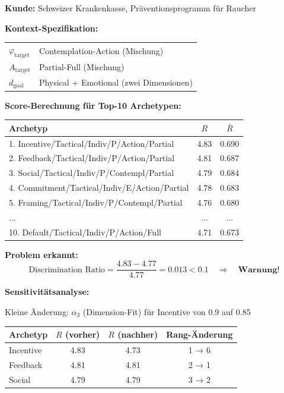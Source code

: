 \begin{tcolorbox}[colback=red!3!white, colframe=red!60!black,
    title=\textbf{Case Study 3: Die Krankenkasse und das Ranking-Roulette}]

\textbf{Kunde:} Schweizer Krankenkasse, Präventionsprogramm für Raucher

\textbf{Kontext-Spezifikation:}
\begin{center}
\begin{tabular}{@{}ll@{}}
$\varphi_{\text{target}}$ & Contemplation-Action (Mischung) \\
$A_{\text{target}}$ & Partial-Full (Mischung) \\
$d_{\text{goal}}$ & Physical + Emotional (zwei Dimensionen) \\
\end{tabular}
\end{center}

\textbf{Score-Berechnung für Top-10 Archetypen:}
\begin{center}
\begin{tabular}{@{}lcc@{}}
\toprule
\textbf{Archetyp} & $R$ & $\bar{R}$ \\
\midrule
1. Incentive/Tactical/Indiv/P/Action/Partial & 4.83 & 0.690 \\
2. Feedback/Tactical/Indiv/P/Action/Partial & 4.81 & 0.687 \\
3. Social/Tactical/Indiv/P/Contempl/Partial & 4.79 & 0.684 \\
4. Commitment/Tactical/Indiv/E/Action/Partial & 4.78 & 0.683 \\
5. Framing/Tactical/Indiv/P/Contempl/Partial & 4.76 & 0.680 \\
... & ... & ... \\
10. Default/Tactical/Indiv/P/Action/Full & 4.71 & 0.673 \\
\bottomrule
\end{tabular}
\end{center}

\textbf{Problem erkannt:}
\begin{equation*}
\text{Discrimination Ratio} = \frac{4.83 - 4.77}{4.77} = 0.013 < 0.1 \quad \Rightarrow \quad \textbf{Warnung!}
\end{equation*}

\textbf{Sensitivitätsanalyse:}

Kleine Änderung: $\alpha_3$ (Dimension-Fit) für Incentive von 0.9 auf 0.85
\begin{center}
\begin{tabular}{@{}lccc@{}}
\toprule
\textbf{Archetyp} & $R$ (vorher) & $R$ (nachher) & \textbf{Rang-Änderung} \\
\midrule
Incentive & 4.83 & 4.73 & 1 → 6 \\
Feedback & 4.81 & 4.81 & 2 → 1 \\
Social & 4.79 & 4.79 & 3 → 2 \\
\bottomrule
\end{tabular}
\end{center}


\end{tcolorbox}
